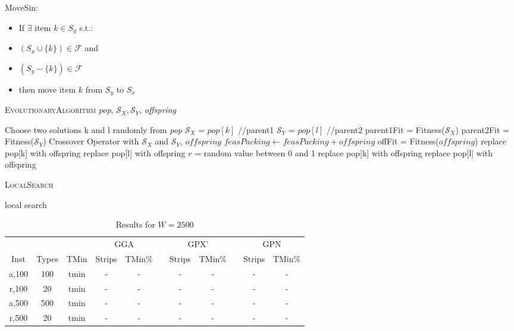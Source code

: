 \documentclass{elsarticle}
\begin{document}
MoveSin:
\begin{itemize}
	\item If $\exists$ item $k \in S_y$ s.t.:
	\item $(S_x \cup \{k\}) \in \mathcal{F}$ and
	\item $(S_y - \{k\}) \in \mathcal{F}$
	\item then move item $k$ from $S_y$ to $S_x$	
\end{itemize}



\begin{algorithm}
\caption{\textsc{EvolutionaryAlgorithm} \textit{pop}, $\mathcal{S}_X, \mathcal{S}_Y$, \textit{offspring}}
\begin{algorithmic}
	\State Choose two solutions k and l randomly from \textit{pop}
	\State $\mathcal{S}_X$ = $pop[k]$ //parent1
	\State $\mathcal{S}_Y$ = $pop[l]$ //parent2
	\State parent1Fit = Fitness($\mathcal{S}_X$)
	\State parent2Fit = Fitness($\mathcal{S}_Y$)
	\Run Crossover Operator with $\mathcal{S}_X$ and $\mathcal{S}_Y$, \Output $offspring$
	\State $feasPacking \gets feasPacking + offspring$
	\State offFit = Fitness($offspring$)
		\State replace pop[k] with offspring
		\State replace pop[l] with offspring
		\State $r$ = random value between 0 and 1
			\State replace pop[k] with offspring
			\State replace pop[l] with offspring
		\EndIf		
	\EndIf	
\end{algorithmic}	
\end{algorithm}	

\begin{algorithm}
	\caption{\textsc{LocalSearch}}
	\begin{algorithmic}
		\State local search
	\end{algorithmic}	
\end{algorithm}

\begin{table}[h!]
	\centering
	\caption{Results for $W=2500$}
	\begin{tabular}{ccccccccccc}\toprule
		& & &\multicolumn{2}{c}{GGA} &\phantom{a}& \multicolumn{2}{c}{GPX'} &\phantom{a}& \multicolumn{2}{c}{GPN}\\
		\cmidrule{4-5} \cmidrule{7-8} \cmidrule{10-11}
		Inst & Types &TMin & Strips & TMin$\%$ && Strips & TMin$\%$ && Strips & TMin$\%$ \\ \midrule	
		a,100 & 100 & tmin & - & - && - & - && - & -\\
		r,100 & 20 & tmin & - & - && - & - && - & -\\
		\midrule
		a,500 & 500 & tmin & - & - && - & - && - & -\\
		r,500 & 20 & tmin & - & - && - & - && - & -\\
		\bottomrule
	\end{tabular}	
	\label{table:EA2500}
\end{table}
\end{document}
